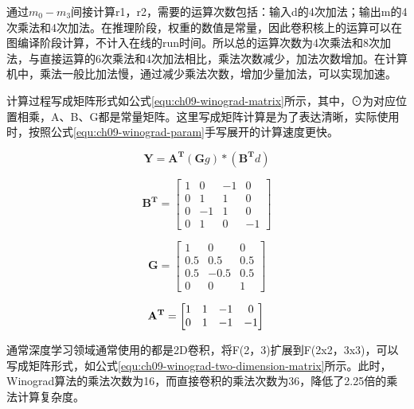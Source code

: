通过$m_0-m_3$间接计算r1，r2，需要的运算次数包括：输入d的4次加法；输出m的4次乘法和4次加法。在推理阶段，权重的数值是常量，因此卷积核上的运算可以在图编译阶段计算，不计入在线的run时间。所以总的运算次数为4次乘法和8次加法，与直接运算的6次乘法和4次加法相比，乘法次数减少，加法次数增加。在计算机中，乘法一般比加法慢，通过减少乘法次数，增加少量加法，可以实现加速。

计算过程写成矩阵形式如公式\ref{equ:ch09-winograd-matrix}所示，其中，⊙为对应位置相乘，A、B、G都是常量矩阵。这里写成矩阵计算是为了表达清晰，实际使用时，按照公式\ref{equ:ch09-winograd-param}手写展开的计算速度更快。

\begin{equation}\label{equ:ch09-winograd-matrix}
\mathbf{Y}=\mathbf{A^T}(\mathbf{G}g)*(\mathbf{B^T}d)
\end{equation}

\begin{equation}\label{equ:ch09-winograd-matrix-bt}
\mathbf{B^T}=
\left[ \begin{matrix} 1 & 0 & -1 & 0 \\ 0 & 1 & 1 & 0 \\ 0 & -1 & 1 & 0 \\ 0 & 1 & 0 & -1 \end{matrix} \right]
\end{equation}

\begin{equation}\label{equ:ch09-winograd-matrix-g}
\mathbf{G}=
\left[ \begin{matrix} 1 & 0 & 0 \\ 0.5 & 0.5 & 0.5 \\ 0.5 & -0.5 & 0.5 \\ 0 & 0 & 1 \end{matrix} \right]
\end{equation}

\begin{equation}\label{equ:ch09-winograd-matrix-at}
\mathbf{A^T}=
\left[ \begin{matrix} 1 & 1 & -1 & 0 \\ 0 & 1 & -1 & -1  \end{matrix} \right] \\
\end{equation}

通常深度学习领域通常使用的都是2D卷积，将F(2，3)扩展到F(2x2，3x3)，可以写成矩阵形式，如公式\ref{equ:ch09-winograd-two-dimension-matrix}所示。此时，Winograd算法的乘法次数为16，而直接卷积的乘法次数为36，降低了2.25倍的乘法计算复杂度。


